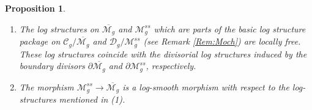\documentclass[11pt]{amsart}
\theoremstyle{plain}
\numberwithin{equation}{section}
\theoremstyle{definition}
\theoremstyle{plain}
\newtheorem{Prop}[Def]{Proposition}
\begin{document}
\begin{Prop}\label{logstruc111}
\begin{enumerate}
\item The log structures on $\overline{\mathcal M_g}$ and $\mathcal M^{ss}_g$ which are parts of the basic log structure package on $\mathcal C_g /\overline{\mathcal M_g} $ and $\mathcal D_g / \mathcal M^{ss}_g$ (see Remark \ref{Rem:Moch}) are locally free. These log structures coincide with the divisorial log structures induced by the boundary divisors $\partial \overline{\mathcal M_g}$ and $\partial \mathcal M^{ss}_g$, respectively. 
\item The morphism $\mathcal M^{ss}_g\longrightarrow \overline{\mathcal M_g}$ is a log-smooth morphism with respect to the log-structures mentioned in (1).
\end{enumerate}
\end{Prop}
\end{document}
